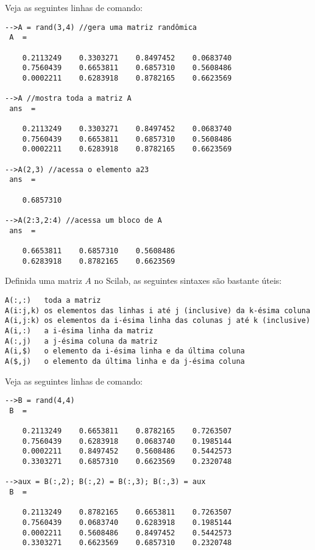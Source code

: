 \begin{ex}
  Veja as seguintes linhas de comando:
\begin{verbatim}
-->A = rand(3,4) //gera uma matriz randômica
 A  =
 
    0.2113249    0.3303271    0.8497452    0.0683740  
    0.7560439    0.6653811    0.6857310    0.5608486  
    0.0002211    0.6283918    0.8782165    0.6623569  
 
-->A //mostra toda a matriz A
 ans  =
 
    0.2113249    0.3303271    0.8497452    0.0683740  
    0.7560439    0.6653811    0.6857310    0.5608486  
    0.0002211    0.6283918    0.8782165    0.6623569  
 
-->A(2,3) //acessa o elemento a23
 ans  =
 
    0.6857310  
 
-->A(2:3,2:4) //acessa um bloco de A
 ans  =
 
    0.6653811    0.6857310    0.5608486  
    0.6283918    0.8782165    0.6623569  
\end{verbatim}
\end{ex}

Definida uma matriz $A$ no Scilab, as seguintes sintaxes são bastante úteis:
\begin{verbatim}
A(:,:)   toda a matriz
A(i:j,k) os elementos das linhas i até j (inclusive) da k-ésima coluna
A(i,j:k) os elementos da i-ésima linha das colunas j até k (inclusive)
A(i,:)   a i-ésima linha da matriz
A(:,j)   a j-ésima coluna da matriz
A(i,$)   o elemento da i-ésima linha e da última coluna
A($,j)   o elemento da última linha e da j-ésima coluna
\end{verbatim}

\begin{ex}
Veja as seguintes linhas de comando:
\begin{verbatim}
-->B = rand(4,4)
 B  =
 
    0.2113249    0.6653811    0.8782165    0.7263507  
    0.7560439    0.6283918    0.0683740    0.1985144  
    0.0002211    0.8497452    0.5608486    0.5442573  
    0.3303271    0.6857310    0.6623569    0.2320748  
 
-->aux = B(:,2); B(:,2) = B(:,3); B(:,3) = aux
 B  =
 
    0.2113249    0.8782165    0.6653811    0.7263507  
    0.7560439    0.0683740    0.6283918    0.1985144  
    0.0002211    0.5608486    0.8497452    0.5442573  
    0.3303271    0.6623569    0.6857310    0.2320748  
\end{verbatim}
\end{ex}

